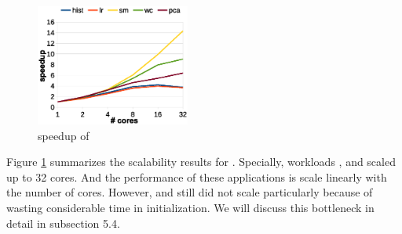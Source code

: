\begin{figure}[!h!t]  
	\centering
	\includegraphics[width=0.45\textwidth]{eps/dmr_speedup.eps}
	\caption{speedup of \myds}
	\label{fig:smr:speedup}
\end{figure}
Figure \ref{fig:smr:speedup} summarizes the scalability results for \myds.
Specially, workloads ,  and  scaled up to 32 cores.
And the performance of these applications is scale linearly with the number of cores.
However,  and  still did not scale particularly because of wasting considerable time in initialization.
We will discuss this bottleneck in detail in subsection 5.4.











